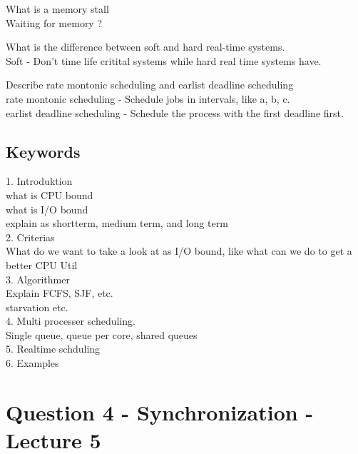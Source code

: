 \documentclass[a4paper,10pt,titlepage]{report}
\begin{document}
What is a memory stall\\
\hspace{10mm} Waiting for memory ? \\
\vspace{5mm}



What is the difference between soft and hard real-time systems.\\
\hspace{10mm} Soft -  Don't time life critital systems while hard real time systems have.\\
\vspace{5mm}




Describe rate montonic scheduling and earlist deadline scheduling\\
\hspace{10mm} rate montonic scheduling - Schedule jobs in intervals, like a, b, c.\\
\hspace{10mm} earlist deadline scheduling - Schedule the process with the first deadline first.\\
\vspace{5mm}


\subsection{Keywords}
1. Introduktion\\
what is CPU bound\\
what is I/O bound\\
explain as shortterm, medium term, and long term\\
2. Criterias\\
What do we want to take a look at as I/O bound, like what can we do to get a better CPU Util\\
3. Algorithmer \\ 
Explain FCFS, SJF, etc.\\
starvation etc. \\
4. Multi processer scheduling.\\
Single queue, queue per core, shared queues\\
5. Realtime schduling\\

6. Examples\\
\newpage
\section{Question 4 - Synchronization - Lecture 5}
\end{document}
